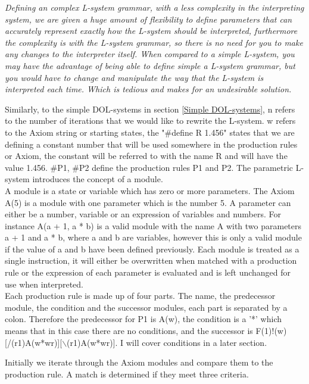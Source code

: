 \begin{flushleft}
\textit{
Defining an complex L-system grammar, with a less complexity in the interpreting system, we are given a huge amount of flexibility to define parameters that can accurately represent exactly how the L-system should be interpreted, furthermore the complexity is with the L-system grammar, so there is no need for you to make any changes to the interpreter itself. When compared to a simple L-system, you may have the advantage of being able to define simple a L-system grammar, but you would have to change and manipulate the way that the L-system is interpreted each time. Which is tedious and makes for an undesirable solution. \\
}

Similarly, to the simple DOL-systems in section \ref{Simple DOL-systems}, n refers to the number of iterations that we would like to rewrite the L-system. w refers to the Axiom string or starting states, the "\#define R 1.456" states that we are defining a constant number that will be used somewhere in the production rules or Axiom, the constant will be referred to with the name R and will have the value 1.456. \#P1, \#P2 define the production rules P1 and P2. The parametric L-system introduces the concept of a module.\\
A module is a state or variable which has zero or more parameters. The Axiom A(5) is a module with one parameter which is the number 5. A parameter can either be a number, variable or an expression of variables and numbers. For instance A(a + 1, a * b) is a valid module with the name A with two parameters a + 1 and a * b, where a and b are variables, however this is only a valid module if the value of a and b have been defined previously. Each module is treated as a single instruction, it will either be overwritten when matched with a production rule or the expression of each parameter is evaluated and is left unchanged for use when interpreted.\\
Each production rule is made up of four parts. The name, the predecessor module, the condition and the successor modules, each part is separated by a colon. Therefore the predecessor for P1 is A(w), the condition is a '*' which means that in this case there are no conditions, and the successor is F(1)!(w)[/(r1)A(w*wr)][$\backslash$(r1)A(w*wr)]. I will cover conditions in a later section.\\

\vspace{5mm}

Initially we iterate through the Axiom modules and compare them to the production rule. A match is determined if they meet three criteria.\\


\end{flushleft}
